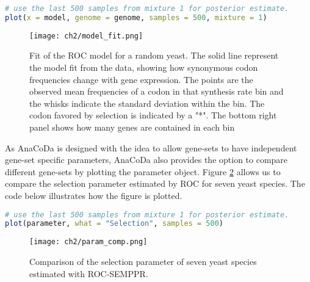 \begin{lstlisting}[language=R]
# use the last 500 samples from mixture 1 for posterior estimate.
plot(x = model, genome = genome, samples = 500, mixture = 1)
\end{lstlisting}

\begin{figure}
  \centering
  \texttt{[image: ch2/model\_fit.png]}\\
  \caption{Fit of the ROC model for a random yeast. The solid line represent the model fit from the data,
showing how synonymous codon frequencies change with gene expression. The points are the observed mean
frequencies of a codon in that synthesis rate bin and the whisks indicate the standard deviation within the bin.
The codon favored by selection is indicated by a "*". The bottom right panel shows how many genes are
contained in each bin}
  \label{fig:cub_dummy}
\end{figure} 

As AnaCoDa is designed with the idea to allow gene-sets to have independent gene-set specific parameters, AnaCoDa also provides the option to compare different gene-sets by plotting the parameter object. 
Figure \ref{fig:comp_dummy} allows us to compare the selection parameter estimated by ROC for seven yeast species.
The code below illustrates how the figure is plotted.

\begin{lstlisting}[language=R]
# use the last 500 samples from mixture 1 for posterior estimate.
plot(parameter, what = "Selection", samples = 500)
\end{lstlisting}



\begin{figure}
  \centering
  \texttt{[image: ch2/param\_comp.png]}\\
  \caption{Comparison of the selection parameter of seven yeast species estimated with ROC-SEMPPR.}
  \label{fig:comp_dummy}
\end{figure} 